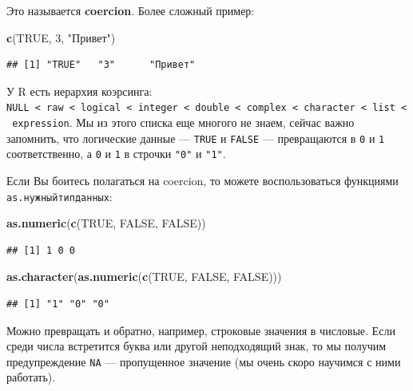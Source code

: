 \documentclass[]{book}
\newenvironment{Shaded}{\begin{snugshade}}{\end{snugshade}}
\newcommand{\DecValTok}[1]{\textcolor[rgb]{0.00,0.00,0.81}{#1}}
\newcommand{\KeywordTok}[1]{\textcolor[rgb]{0.13,0.29,0.53}{\textbf{#1}}}
\newcommand{\NormalTok}[1]{#1}
\newcommand{\OtherTok}[1]{\textcolor[rgb]{0.56,0.35,0.01}{#1}}
\newcommand{\StringTok}[1]{\textcolor[rgb]{0.31,0.60,0.02}{#1}}
\begin{document}
Это называется \textbf{coercion}.
Более сложный пример:

\begin{Shaded}
\begin{Highlighting}[]
\KeywordTok{c}\NormalTok{(}\OtherTok{TRUE}\NormalTok{, }\DecValTok{3}\NormalTok{, }\StringTok{"Привет"}\NormalTok{)}
\end{Highlighting}
\end{Shaded}

\begin{verbatim}
## [1] "TRUE"   "3"      "Привет"
\end{verbatim}

У R есть иерархия коэрсинга:
\texttt{NULL\ \textless{}\ raw\ \textless{}\ logical\ \textless{}\ integer\ \textless{}\ double\ \textless{}\ complex\ \textless{}\ character\ \textless{}\ list\ \textless{}\ expression}.
Мы из этого списка еще многого не знаем, сейчас важно запомнить, что логические данные --- \texttt{TRUE} и \texttt{FALSE} --- превращаются в \texttt{0} и \texttt{1} соответственно, а \texttt{0} и \texttt{1} в строчки \texttt{"0"} и \texttt{"1"}.

Если Вы боитесь полагаться на coercion, то можете воспользоваться функциями \texttt{as.нужныйтипданных}:

\begin{Shaded}
\begin{Highlighting}[]
\KeywordTok{as.numeric}\NormalTok{(}\KeywordTok{c}\NormalTok{(}\OtherTok{TRUE}\NormalTok{, }\OtherTok{FALSE}\NormalTok{, }\OtherTok{FALSE}\NormalTok{))}
\end{Highlighting}
\end{Shaded}

\begin{verbatim}
## [1] 1 0 0
\end{verbatim}

\begin{Shaded}
\begin{Highlighting}[]
\KeywordTok{as.character}\NormalTok{(}\KeywordTok{as.numeric}\NormalTok{(}\KeywordTok{c}\NormalTok{(}\OtherTok{TRUE}\NormalTok{, }\OtherTok{FALSE}\NormalTok{, }\OtherTok{FALSE}\NormalTok{)))}
\end{Highlighting}
\end{Shaded}

\begin{verbatim}
## [1] "1" "0" "0"
\end{verbatim}

Можно превращать и обратно, например, строковые значения в числовые. Если среди числа встретится буква или другой неподходящий знак, то мы получим предупреждение \texttt{NA} --- пропущенное значение (мы очень скоро научимся с ними работать).
\end{document}
